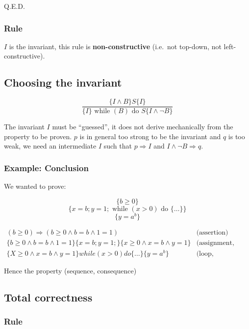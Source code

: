 \documentclass[12pt, a4paper]{book}
\begin{document}
    Q.E.D.

    \subsubsection{Rule}

    $I$ is the invariant, this rule is \textbf{non-constructive} (i.e.\ not
    top-down, not left-constructive).

    \subsection{Choosing the invariant}

    $$
    \frac
    { \{ I \land B \} S \{ I \} }
    { \{ I \} \textrm{ while } (B) \textrm{ do } S \{ I \land \lnot B \} }
    $$

    The invariant $I$ must be \enquote{guessed}, it does not derive mechanically
    from the property to be proven. $p$ is in general too strong to be the
    invariant and $q$ is too weak, we need an intermediate $I$ such that
    $p \Rightarrow I$ and $I \land \lnot B \Rightarrow q$.

    \subsubsection{Example: Conclusion}

    We wanted to prove:

    $$
    \{ b \ge 0 \}
    $$
    $$
    \{ x =b ; y=1; \textrm{ while } (x>0) \textrm{ do } \{ \ldots \} \}
    $$
    $$
    \{ y = {a}^{b} \}
    $$

    \begin{eqnarray*}
        (b \ge 0) \Rightarrow (b \ge 0 \land b =b \land 1 = 1) & \textrm{(assertion)} \\
        \{ b \ge 0 \land b = b \land 1 = 1 \} \{ x=b; y=1; \} \{ x \ge 0 \land x = b \land y = 1 \} & \textrm{(assignment, sequence)} \\
        \{ X \ge 0 \land x =b \land y = 1 \} while (x>0) do \{ \ldots \} \{ y = {a}^{b} \} & \textrm{(loop, consequence)}
    \end{eqnarray*}

    Hence the property (sequence, consequence)

    \subsection{Total correctness}

    \subsubsection{Rule}
\end{document}
